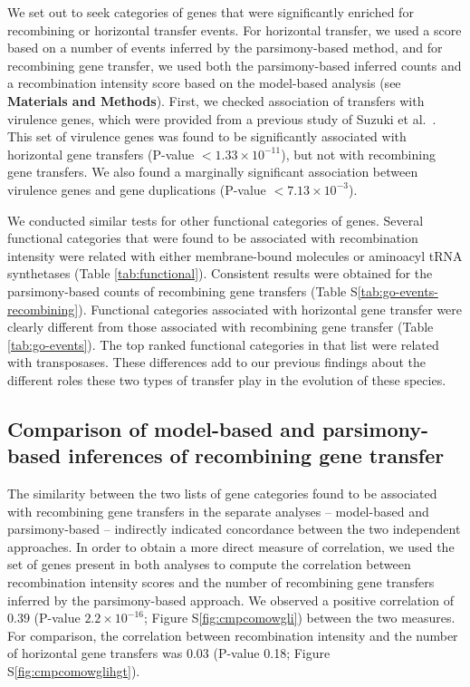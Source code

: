 \documentclass[10pt]{article}
\let\citet\cite
\begin{document}
We set out to seek categories of genes that were significantly enriched for
recombining or horizontal transfer events. For horizontal transfer, we used a
score based on a number of events inferred by the parsimony-based method, and
for recombining gene transfer, we used both the parsimony-based inferred counts
and a recombination intensity score based on the model-based analysis (see
\textbf{Materials and Methods}). First, we checked association of transfers with
virulence genes, which were provided from a previous study of Suzuki et al.\
\citet{Suzuki2011}.  This set of virulence genes was found to be significantly
associated with horizontal gene transfers (P-value $<1.33 \times 10^{-11}$), but
not with recombining gene transfers. We also found a marginally significant
association between virulence genes and gene duplications (P-value $<7.13 \times
10^{-3}$).

We conducted similar tests for other functional categories of genes. Several
functional categories that were found to be associated with recombination
intensity were related with either membrane-bound molecules or aminoacyl tRNA
synthetases (Table \ref{tab:functional}). Consistent results were obtained for
the parsimony-based counts of recombining gene transfers (Table
S\ref{tab:go-events-recombining}).  Functional categories associated with
horizontal gene transfer were clearly different from those associated with
recombining gene transfer (Table \ref{tab:go-events}). The top ranked functional
categories in that list were related with transposases. These differences add to
our previous findings about the different roles these two types of transfer play
in the evolution of these species.

\subsection*{Comparison of model-based and parsimony-based inferences of recombining gene transfer}

The similarity between the two lists of gene categories found to be associated
with recombining gene transfers in the separate analyses -- model-based and
parsimony-based --  indirectly indicated concordance between the two independent
approaches.  In order to obtain a more direct measure of correlation, we used
the set of genes present in both analyses to compute the correlation between
recombination intensity scores and the number of recombining gene transfers
inferred by the parsimony-based approach. We observed a positive correlation of
$0.39$ (P-value $2.2\times10^{-16}$; Figure S\ref{fig:cmpcomowgli}) between the
two measures.  For comparison, the correlation between recombination intensity
and the number of horizontal gene transfers was 0.03 (P-value 0.18;
Figure S\ref{fig:cmpcomowglihgt}).  
\end{document}
